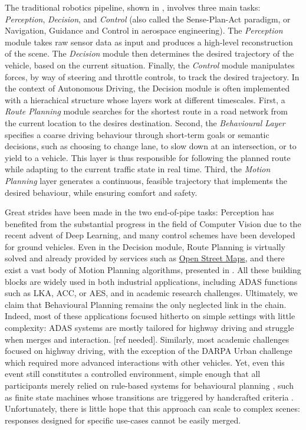 The traditional robotics pipeline, shown in , involves three main tasks: \emph{Perception}, \emph{Decision}, and \emph{Control} (also called the Sense-Plan-Act paradigm, or Navigation, Guidance and Control in aerospace engineering). The \emph{Perception} module takes raw sensor data as input and produces a high-level reconstruction of the scene. The \emph{Decision} module then determines the desired trajectory of the vehicle, based on the current situation. Finally, the \emph{Control} module manipulates forces, by way of steering and throttle controls, to track the desired trajectory. In the context of Autonomous Driving, the Decision module is often implemented with a hierachical structure whose layers work at different timescales. First, a \emph{Route Planning} module searches for the shortest route in a road network from the current location to the desires destination. Second, the \emph{Behavioural Layer} specifies a coarse driving behaviour through short-term goals or semantic decisions, such as choosing to change lane, to slow down at an intersection, or to yield to a vehicle. This layer is thus responsible for following the planned route while adapting to the current traffic state in real time. Third, the \emph{Motion Planning} layer generates a continuous, feasible trajectory that implements the desired behaviour, while ensuring comfort and safety.

Great strides have been made in the two end-of-pipe tasks: Perception has benefited from the substantial progress in the field of Computer Vision due to the recent advent of Deep Learning, and many control schemes \citep[surveyed in][]{Polack2018} have been developed for ground vehicles. Even in the Decision module, Route Planning is virtually solved and already provided by services such as \href{https://wiki.openstreetmap.org/wiki/Routing}{Open Street Maps}, and there exist a vast body of Motion Planning algorithms, presented in . All these building blocks are widely used in both industrial applications, including ADAS functions such as LKA, ACC, or AES, and in academic research challenges. Ultimately, we claim that Behavioural Planning remains the only neglected link in the chain. Indeed, most of these applications focused hitherto on simple settings with little complexity: ADAS systems are mostly tailored for highway driving and struggle when merges and interaction. [ref needed]. Similarly, most academic challenges focused on highway driving, with the exception of the DARPA Urban challenge which required more advanced interactions with other vehicles. Yet, even this event still constitutes a controlled environment, simple enough that all participants merely relied on rule-based systems for behavioural planning \citep{Buehler2009}, such as finite state machines whose transitions are triggered by handcrafted criteria \citep[\eg][]{Baker2008}. Unfortunately, there is little hope that this approach can scale to complex scenes: responses designed for specific use-cases cannot be easily merged.

